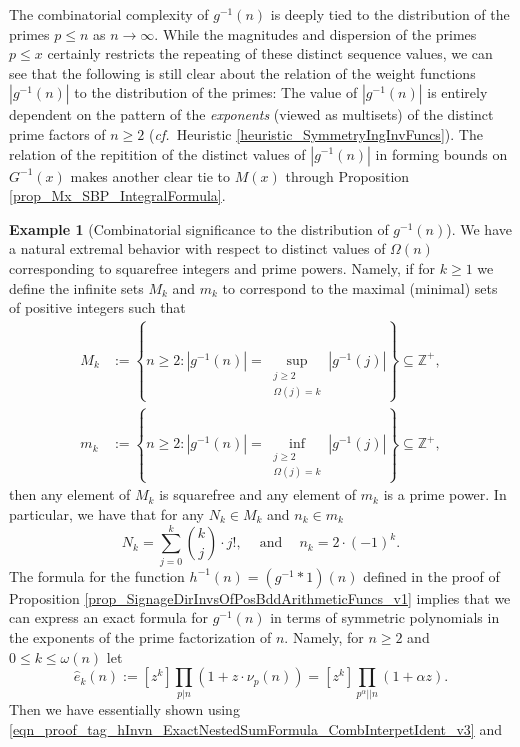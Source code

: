 \documentclass[11pt,reqno,a4letter]{article}
\numberwithin{figure}{section}
\numberwithin{table}{section}
\newcommand{\cf}{\textit{cf.\ }}
\theoremstyle{plain}
\numberwithin{theorem}{section}
\theoremstyle{definition}
\newtheorem{example}[theorem]{Example}
\begin{document}
The combinatorial complexity of $g^{-1}(n)$ is deeply tied to the distribution of the primes 
$p \leq n$ as $n \rightarrow \infty$. 
While the magnitudes and dispersion of the primes $p \leq x$ certainly restricts the 
repeating of these distinct sequence 
values, we can see that the following 
is still clear about the relation of the weight functions $|g^{-1}(n)|$ to the 
distribution of the primes: 
The value of $|g^{-1}(n)|$ is entirely dependent on the pattern of the \emph{exponents} 
(viewed as multisets) of the distinct prime factors of $n \geq 2$ 
(\cf Heuristic \ref{heuristic_SymmetryIngInvFuncs}). 
The relation of the repitition of the distinct values 
of $|g^{-1}(n)|$ in forming bounds on $G^{-1}(x)$ makes another clear tie to 
$M(x)$ through Proposition \ref{prop_Mx_SBP_IntegralFormula}. 

\begin{example}[Combinatorial significance to the distribution of $g^{-1}(n)$] 
We have a natural extremal behavior with respect to distinct values of $\Omega(n)$ 
corresponding to squarefree integers and prime powers. Namely, if for $k \geq 1$ we define the 
infinite sets $M_k$ and $m_k$ to correspond to the maximal (minimal) sets of 
positive integers such that 
\begin{align*} 
M_k & := \left\{n \geq 2: |g^{-1}(n)| = \underset{{\substack{j \geq 2 \\ \Omega(j) = k}}}{\operatorname{sup}} 
     |g^{-1}(j)|\right\} \subseteq \mathbb{Z}^{+}, \\  
m_k & := \left\{n \geq 2: |g^{-1}(n)| = \underset{{\substack{j \geq 2 \\ \Omega(j) = k}}}{\operatorname{inf}} 
     |g^{-1}(j)|\right\} \subseteq \mathbb{Z}^{+}, 
\end{align*} 
then any element of $M_k$ is squarefree and any element of $m_k$ is a prime power. 
In particular, we have that for any $N_k \in M_k$ and $n_k \in m_k$
\[
N_k = \sum_{j=0}^{k} \binom{k}{j} \cdot j!, \quad \mathrm{\ and\ } \quad n_k = 2 \cdot (-1)^{k}. 
\]
The formula for the function $h^{-1}(n) = (g^{-1} \ast 1)(n)$ defined in the proof of 
Proposition \ref{prop_SignageDirInvsOfPosBddArithmeticFuncs_v1} implies that we can express 
an exact formula for $g^{-1}(n)$ in terms of symmetric polynomials in the 
exponents of the prime factorization of $n$. 
Namely, for $n \geq 2$ and $0 \leq k \leq \omega(n)$ let 
\[
\widehat{e}_k(n) := [z^k] \prod_{p|n} (1 + z \cdot \nu_p(n)) = [z^k] \prod_{p^{\alpha} || n} (1 + \alpha z). 
\]
Then we have essentially shown using 
\eqref{eqn_proof_tag_hInvn_ExactNestedSumFormula_CombInterpetIdent_v3} and 

\end{example}
\end{document}
